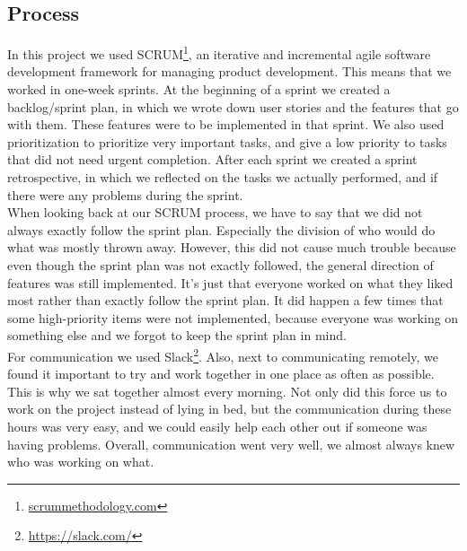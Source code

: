 \subsection{Process}
In this project we used SCRUM\footnote{\url{scrummethodology.com}}, an iterative and incremental agile software development framework for managing product development. This means that we worked in one-week sprints. At the beginning of a sprint we created a backlog/sprint plan, in which we wrote down user stories and the features that go with them. These features were to be implemented in that sprint. We also used prioritization to prioritize very important tasks, and give a low priority to tasks that did not need urgent completion. After each sprint we created a sprint retrospective, in which we reflected on the tasks we actually performed, and if there were any problems during the sprint.\\
When looking back at our SCRUM process, we have to say that we did not always exactly follow the sprint plan. Especially the division of who would do what was mostly thrown away. However, this did not cause much trouble because even though the sprint plan was not exactly followed, the general direction of features was still implemented. It's just that everyone worked on what they liked most rather than exactly follow the sprint plan. It did happen a few times that some high-priority items were not implemented, because everyone was working on something else and we forgot to keep the sprint plan in mind.\\
For communication we used Slack\footnote{\url{https://slack.com/}}. Also, next to communicating remotely, we found it important to try and work together in one place as often as possible. This is why we sat together almost every morning. Not only did this force us to work on the project instead of lying in bed, but the communication during these hours was very easy, and we could easily help each other out if someone was having problems. Overall, communication went very well, we almost always knew who was working on what.
